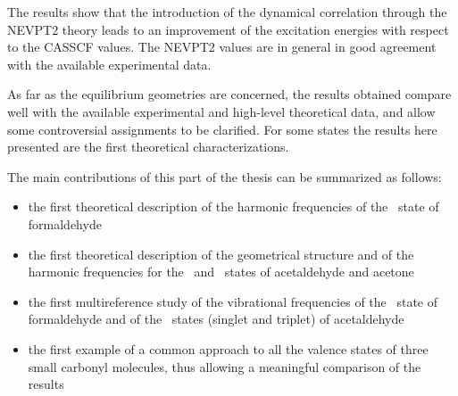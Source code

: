 The results show that the introduction of the dynamical correlation through
the NEVPT2 theory leads to an improvement of the excitation energies with
respect to the CASSCF values. The NEVPT2 values are in general in good
agreement with the available experimental data.

As far as the equilibrium geometries are concerned, the results obtained
compare well with the available experimental and high-level theoretical
data, and allow some controversial assignments to be clarified. For some
states the results here presented are the first theoretical
characterizations.  

The main contributions of this part of the thesis can be summarized as follows:
\begin{itemize}
\item the first theoretical description of the harmonic frequencies of the \tspi\ state of formaldehyde
\item the first theoretical description of the geometrical structure and of the harmonic frequencies 
for the \tpipi\ and \tspi\ states of acetaldehyde and acetone
\item the first multireference study of the vibrational frequencies of the \tpipi\ state of formaldehyde and of
the \npi\ states (singlet and triplet) of acetaldehyde
\item the first example of a common approach to all the valence states of three small carbonyl molecules,
thus allowing a meaningful comparison of the results
\end{itemize}

